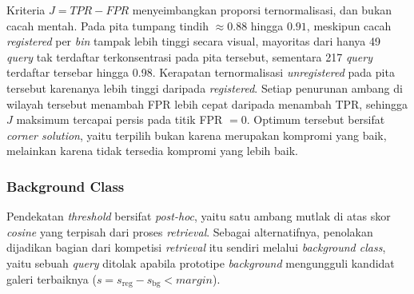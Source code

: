 Kriteria
$J=\mathit{TPR}-\mathit{FPR}$ menyeimbangkan proporsi ternormalisasi, dan bukan cacah
mentah. Pada pita tumpang tindih $\approx 0{.}88$ hingga $0{.}91$, meskipun cacah
\textit{registered} per \textit{bin} tampak lebih tinggi secara visual, mayoritas dari
hanya 49 \textit{query} tak terdaftar terkonsentrasi pada pita tersebut, sementara 217
\textit{query} terdaftar tersebar hingga 0.98. Kerapatan ternormalisasi
\textit{unregistered} pada pita tersebut karenanya lebih tinggi daripada
\textit{registered}. Setiap penurunan ambang di wilayah tersebut menambah FPR lebih cepat
daripada menambah TPR, sehingga $J$ maksimum tercapai persis pada titik FPR $=0$. Optimum
tersebut bersifat \textit{corner solution}, yaitu terpilih bukan karena merupakan kompromi
yang baik, melainkan karena tidak tersedia kompromi yang lebih baik.

\subsubsection{Background Class}
\label{subsec:openset_background}

Pendekatan \textit{threshold} bersifat \textit{post-hoc}, yaitu satu ambang mutlak di atas
skor \textit{cosine} yang terpisah dari proses \textit{retrieval}. Sebagai alternatifnya,
penolakan dijadikan bagian dari kompetisi \textit{retrieval} itu sendiri melalui
\textit{background class}, yaitu sebuah \textit{query} ditolak apabila prototipe
\textit{background} mengungguli kandidat galeri terbaiknya
($s = s_{\text{reg}} - s_{\text{bg}} < \textit{margin}$).

